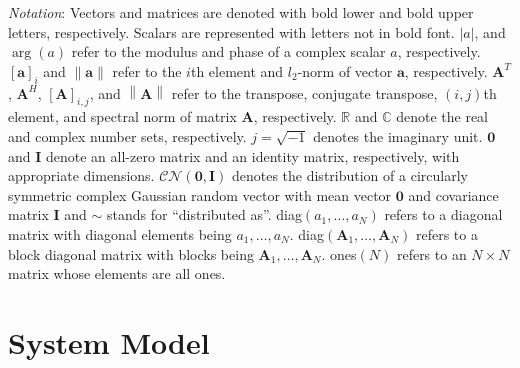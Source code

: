 \documentclass[twocolumn,10pt]{IEEEtran}
\begin{document}
\textit{Notation}: Vectors and matrices are denoted with bold lower and bold upper letters, respectively.
Scalars are represented with letters not in bold font.
$\left|a\right|$, and $\arg\left(a\right)$ refer to the modulus and phase of a complex scalar $a$, respectively.
$\left[\mathbf{a}\right]_{i}$ and $\left\|\mathbf{a}\right\|$ refer to the $i$th element and $l_{2}$-norm of vector $\mathbf{a}$, respectively.
$\mathbf{A}^{T}$, $\mathbf{A}^{H}$, $\left[\mathbf{A}\right]_{i,j}$, and $\left\|\mathbf{A}\right\|$ refer to the transpose, conjugate transpose, $\left(i,j\right)$th element, and spectral norm of matrix $\mathbf{A}$, respectively.
$\mathbb{R}$ and $\mathbb{C}$ denote the real and complex number sets, respectively.
$j=\sqrt{-1}$ denotes the imaginary unit.
$\mathbf{0}$ and $\mathbf{I}$ denote an all-zero matrix and an identity matrix, respectively, with appropriate dimensions.
$\mathcal{CN}\left(\mathbf{0},\mathbf{I}\right)$ denotes the distribution of a circularly symmetric complex Gaussian random vector with mean vector $\mathbf{0}$ and covariance matrix $\mathbf{I}$ and $\sim$ stands for \textquotedblleft distributed as\textquotedblright.
diag$\left(a_{1},\ldots,a_{N}\right)$ refers to a diagonal matrix with diagonal elements being $a_{1},\ldots,a_{N}$.
diag$\left(\mathbf{A}_{1},\ldots,\mathbf{A}_{N}\right)$ refers to a block diagonal matrix with blocks being $\mathbf{A}_{1},\ldots,\mathbf{A}_{N}$.
ones$\left(N\right)$ refers to an $N\times N$ matrix whose elements are all ones.

\section{System Model}
\label{sec:system-model}
\end{document}
